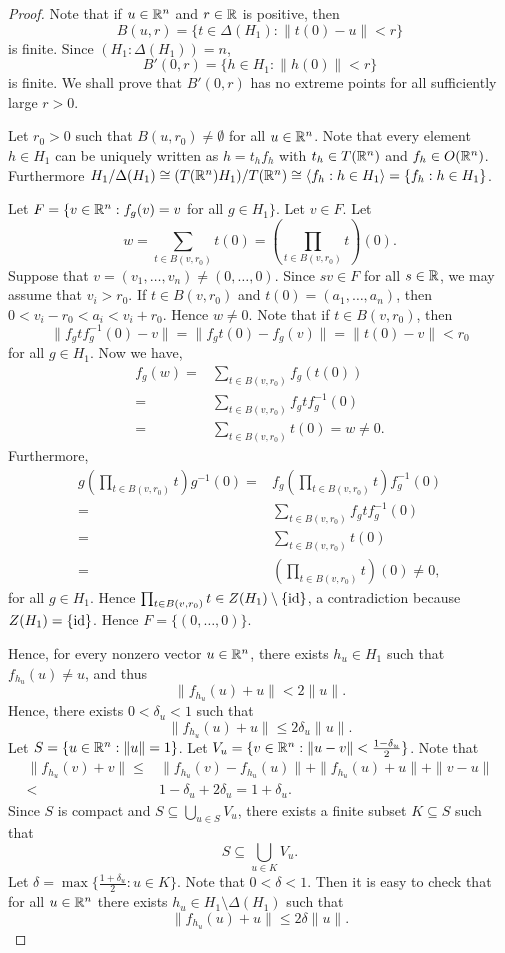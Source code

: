 \begin{proof}
Note that if $u\in \mathbb{R}^n$ and $r\in\mathbb{R}$ is positive, then
\[ B(u,r)=\{ t\in\Delta(H_1) : \| t(0)-u\|<r\}\]
is finite. Since $(H_1:\Delta(H_1))=n$,
\[B'(0,r)=\{ h\in H_1 :  \| h(0)\|<r\}\]
is finite. We shall prove that $B'(0,r)$ has no extreme points for  all sufficiently large $r>0$. 

Let $r_0>0$ such that $B(u,r_0)\neq\emptyset$ for all $u\in\mathbb{R}^n$. Note that every element $h\in H_1$ can be uniquely written as $h=t_hf_h$ with $t_h\in T(\mathbb{R}^n)$ and $f_h\in O(\mathbb{R}^n)$. Furthermore $H_1/\Delta(H_1)\cong (T(\mathbb{R}^n)H_1)/T(\mathbb{R}^n)\cong \langle f_h :h\in H_1\rangle=\{ f_h : h\in H_1\}$. 

Let $F=\{ v\in \mathbb{R}^n : f_g(v)=v$ for all $ g\in H_1\}$. Let $v\in F$. Let 
\[w=\sum_{t\in B(v,r_0)}t(0)=\left(\prod_{t\in B(v,r_0)}t\right)(0).\] 
Suppose that $v=(v_1,\dots ,v_n)\neq (0,\dots ,0)$. Since $sv\in F$ for all $s\in \mathbb{R}$, we may assume that $v_i>r_0$. If $t\in B(v,r_0)$ and $t(0)=(a_1,\dots ,a_n)$, then $0<v_i-r_0<a_i<v_i+r_0$. Hence $w\neq 0$. Note that if $t\in B(v,r_0)$, then
\[\|f_gtf_g^{-1}(0)-v\|=\|f_gt(0)-f_g(v)\|=\|t(0)-v\|<r_0\]
for all $g\in H_1$.
Now we have,
\begin{align*}
    f_g(w)=&\sum_{t\in B(v,r_0)}f_g(t(0))\\
    =&\sum_{t\in B(v,r_0)}f_gtf_g^{-1}(0)\\
    =&\sum_{t\in B(v,r_0)}t(0)=w\neq 0.
\end{align*}
Furthermore,
\begin{align*}g\left(\prod_{t\in B(v,r_0)}t\right)g^{-1}(0)=&f_g\left(\prod_{t\in B(v,r_0)}t\right)f_g^{-1}(0)\\
=&\sum_{t\in B(v,r_0)}f_gtf_g^{-1}(0)\\
    =&\sum_{t\in B(v,r_0)}t(0)\\
=&\left(\prod_{t\in B(v,r_0)}t\right)(0)\neq 0,
\end{align*}
for all $g\in H_1$. Hence $\prod_{t\in B(v,r_0)}t\in Z(H_1)\setminus\{\operatorname{id}\}$, a contradiction because $Z(H_1)=\{ \operatorname{id}\}$. Hence $F=\{ (0,\dots ,0)\}$.

Hence, for every nonzero vector $u\in\mathbb{R}^n$, there exists $h_u\in H_1$ such that $f_{h_u}(u)\neq u$, and thus
\[ \|f_{h_u}(u)+u\|<2\|u\|.\]
Hence, there exists $0<\delta_u<1$ such that
\[\|f_{h_u}(u)+u\|\leq 2\delta_u\|u\|. \]
Let $S=\{ u\in \mathbb{R}^n : \| u\|=1\}$. Let $V_u=\{ v\in\mathbb{R}^n :\|u-v\|<\frac{1-\delta_u}{2} \}$. Note that
\begin{align*}\|f_{h_u}(v)+v \|\leq &\|f_{h_u}(v)-f_{h_u}(u)\|+\|f_{h_u}(u)+u\|+\|v-u\|\\
<& 1-\delta_u+2\delta_u=1+\delta_u.
\end{align*}
Since $S$ is compact and $S\subseteq\bigcup_{u\in S}V_u$, there exists a finite subset $K\subseteq S$ such that 
\[S\subseteq\bigcup_{u\in K}V_u.\]
Let $\delta=\max\{ \frac{1+\delta_u}{2} :u\in K\}$. Note that $0<\delta<1$. Then it is easy to check that for all $u\in \mathbb{R}^n$ there exists $h_u\in H_1\setminus\Delta(H_1)$ such that
\[ \|f_{h_u}(u)+u\|\leq 2\delta\| u\|.\]


\end{proof}
